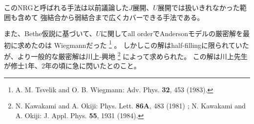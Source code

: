 \documentclass[a4j]{jarticle}
\begin{document}
このNRGと呼ばれる手法は以前議論した$J$展開、$U$展開では扱いきれなかった範囲も含めて
強結合から弱結合まで広くカバーできる手法である。


また、Bethe仮説に基づいて、$U$に関してall orderでAndersonモデルの厳密解を最初に求めたのは
Wiegmannだった
\footnote{
	A. M. Tsvelik and O. B. Wiegmann: Adv. Phys. {\bf 32}, 453 (1983).
}
。
しかしこの解はhalf-fillingに限られていたが、より一般的な厳密解は川上-興地
\footnote{
	N. Kawakami and A. Okiji: Phys. Lett. {\bf 86A}, 483 (1981) ;
	N. Kawakami and A. Okiji: J. Appl. Phys. {\bf 55}, 1931 (1984).
}
によって求められた。
この解は川上先生が修士1年、2年の頃に急に閃いたとのこと。
\end{document}
